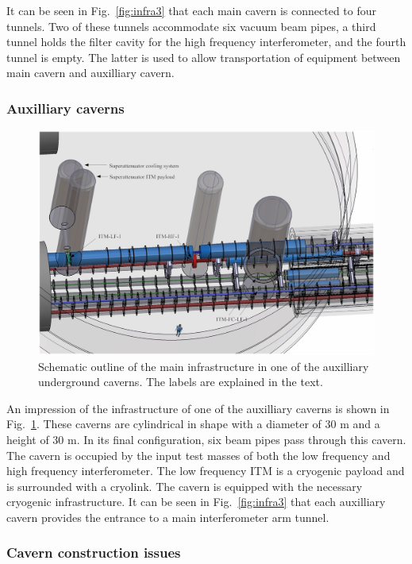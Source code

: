 It can be seen in Fig.~\ref{fig:infra3} that each main cavern is connected to
four tunnels. Two of these tunnels accommodate six vacuum beam pipes, 
a third tunnel holds the filter cavity for the high frequency interferometer,
and the fourth tunnel is empty. The latter is used to allow transportation
of equipment between main cavern and auxilliary cavern.

\subsubsection*{Auxilliary caverns}

\begin{figure}[htbp!]
\centering
\includegraphics[width=16cm]{./Sec_SiteInfra/Figures/infra4.jpg}
\caption{Schematic outline of the main infrastructure in one of the auxilliary underground caverns.
The labels are explained in the text.}
\label{fig:infra4}
\end{figure}

An impression of the infrastructure of one of the auxilliary
caverns is shown in Fig.~\ref{fig:infra4}. 
These caverns are cylindrical in shape with a diameter of 30 m and a
height of 30 m. In its final configuration, six beam pipes pass through this
cavern. The cavern is occupied by the input test masses of both the low
frequency and high frequency interferometer. The low frequency ITM is
a cryogenic payload and is surrounded with a cryolink. The cavern is
equipped with the necessary cryogenic infrastructure.
It can be seen in Fig.~\ref{fig:infra3} that each auxilliary cavern provides the
entrance to a main interferometer arm tunnel.

\subsubsection*{Cavern construction issues}


